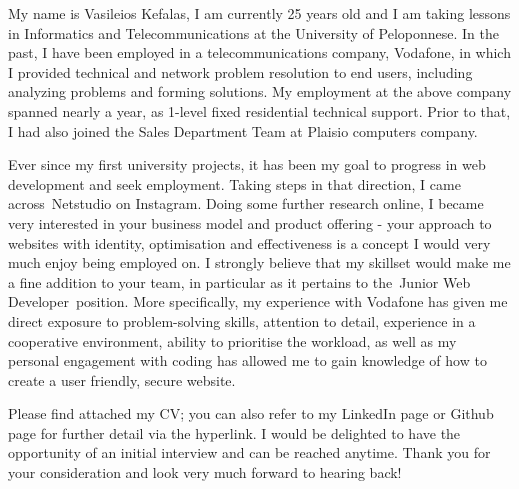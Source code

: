 \documentclass[11pt, a4paper]{awesome-cv} %
\begin{document}
\makecvheader %

\makelettertitle %


\begin{cvletter}



    My name is Vasileios Kefalas, I am currently 25 years old and I am taking lessons in Informatics and Telecommunications at the University of Peloponnese.
    In the past, I have been employed in a telecommunications company, Vodafone, in which I provided technical and network problem resolution to end users, including analyzing problems and forming solutions. My employment at the above company spanned nearly a year, as  1-level fixed residential technical support. Prior to that, I had also joined the Sales Department Team at Plaisio computers company.


    Ever since my first university projects, it has been my goal to progress in web development and seek employment. Taking steps in that direction, I came across Netstudio on Instagram. Doing some further research online,
    I became very interested in your business model and product offering - your approach to websites with identity, optimisation and effectiveness is a concept I would very much enjoy being employed on. I strongly believe that my skillset
    would make me a fine addition to your team, in particular as it pertains to the Junior Web Developer position. More specifically, my experience with Vodafone has given me direct exposure to problem-solving skills,
    attention to detail, experience in a cooperative environment, ability to prioritise the workload, as well as my personal engagement with coding has allowed me to gain knowledge of how to create a user friendly, secure website.


    Please find attached my CV; you can also refer to my LinkedIn page or Github page for further detail via the hyperlink.
    I would be delighted to have the opportunity of an initial interview and can be reached anytime.
    Thank you for your consideration and look very much forward to hearing back!

\end{cvletter}


\makeletterclosing %
\end{document}
